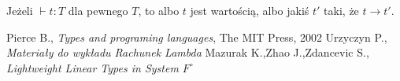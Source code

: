 \documentclass[11pt,leqno]{article}
\begin{document}
\begin{twierdzenie}
Jeżeli $\vdash t:T$ dla pewnego $T$, to albo $t$ jest wartością, albo jakiś $t'$ taki, że $t \rightarrow t'$.
\end{twierdzenie}

\thispagestyle{empty}
\begin{thebibliography}{99}

 Pierce B., \textit{Types and programing languages}, The MIT Press, 2002 
 Urzyczyn P., \textit{Materiały do wykładu Rachunek Lambda} 
 Mazurak K.,Zhao J.,Zdancevic S., \textit{Lightweight Linear Types in System $F^\circ$}


	  
\end{thebibliography}
\end{document}
